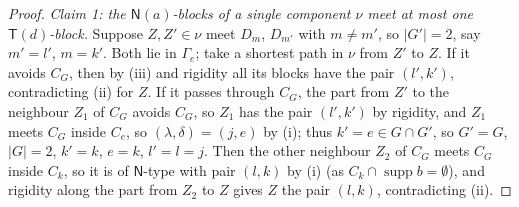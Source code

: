 \documentclass[11pt]{amsart}
\theoremstyle{definition}
\newcommand{\supp}{\operatorname{supp}}
\newcommand{\T}{\mathsf{T}}
\newcommand{\N}{\mathsf{N}}
\begin{document}
\begin{proof}
\emph{Claim 1: the $\N(a)$-blocks of a single component $\nu$ meet at most one $\T(d)$-block.} Suppose $Z,Z'\in\nu$ meet $D_m$, $D_{m'}$ with $m\ne m'$, so $|G'|=2$, say $m'=l'$, $m=k'$. Both lie in $\Gamma_e$; take a shortest path in $\nu$ from $Z'$ to $Z$. If it avoids $C_G$, then by (iii) and rigidity all its blocks have the pair $(l',k')$, contradicting (ii) for $Z$. If it passes through $C_G$, the part from $Z'$ to the neighbour $Z_1$ of $C_G$ avoids $C_G$, so $Z_1$ has the pair $(l',k')$ by rigidity, and $Z_1$ meets $C_G$ inside $C_e$, so $(\lambda,\delta)=(j,e)$ by (i); thus $k'=e\in G\cap G'$, so $G'=G$, $|G|=2$, $k'=k$, $e=k$, $l'=l=j$. Then the other neighbour $Z_2$ of $C_G$ meets $C_G$ inside $C_k$, so it is of $\N$-type with pair $(l,k)$ by (i) (as $C_k\cap\supp b=\emptyset$), and rigidity along the part from $Z_2$ to $Z$ gives $Z$ the pair $(l,k)$, contradicting (ii).


\end{proof}
\end{document}
